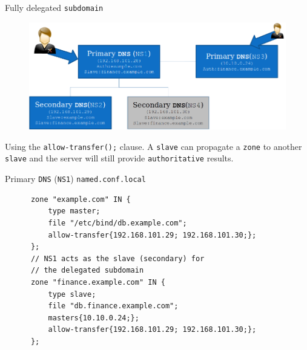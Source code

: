 \documentclass[xcolor=table]{beamer}
\begin{document}
\begin{frame}{Fully delegated \texttt{subdomain}}
  \begin{figure}
    \begin{center}
      \includegraphics[width=1\linewidth]{FullyDelegated2.png}
    \end{center}
  \end{figure}
  \begin{tcolorbox}
    \begin{center}
      \scriptsize Using the \texttt{allow-transfer();} clause. A \texttt{slave} can propagate a \texttt{zone} to another \texttt{slave} and the server will still provide \texttt{authoritative} results.
    \end{center}
  \end{tcolorbox}
\end{frame}

\begin{frame}[fragile]{Primary \texttt{DNS} (\texttt{NS1}) \texttt{named.conf.local}}
  \begin{tcolorbox}
    \lstset{
      basicstyle=\tiny\ttfamily,
    }
    \begin{lstlisting}
      zone "example.com" IN {
	      type master;
	      file "/etc/bind/db.example.com";
	      allow-transfer{192.168.101.29; 192.168.101.30;};
      };
      // NS1 acts as the slave (secondary) for 
      // the delegated subdomain
      zone "finance.example.com" IN {
	      type slave;
	      file "db.finance.example.com";
	      masters{10.10.0.24;};
	      allow-transfer{192.168.101.29; 192.168.101.30;};
      };    
    \end{lstlisting}
  \end{tcolorbox}
\end{frame}
\end{document}
